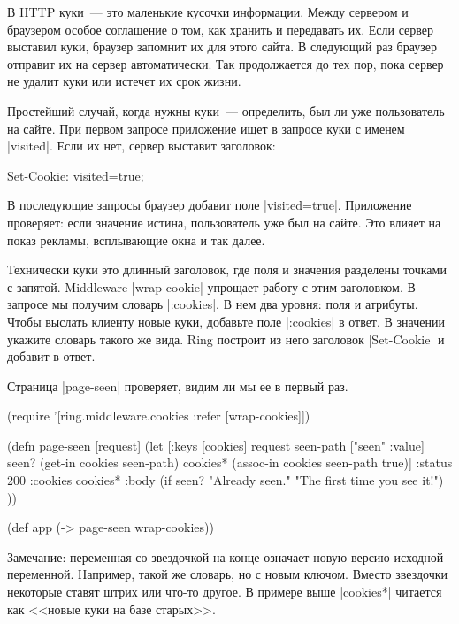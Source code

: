 В HTTP куки~--- это маленькие кусочки информации. Между сервером и браузером
особое соглашение о том, как хранить и передавать их. Если сервер выставил куки,
браузер запомнит их для этого сайта. В следующий раз браузер отправит их на
сервер автоматически. Так продолжается до тех пор, пока сервер не удалит куки
или истечет их срок жизни.

Простейший случай, когда нужны куки~--- определить, был ли уже пользователь на
сайте. При первом запросе приложение ищет в запросе куки с именем
\spverb|visited|. Если их нет, сервер выставит заголовок:

\begin{english}
  \begin{http}
Set-Cookie: visited=true;
  \end{http}
\end{english}

В последующие запросы браузер добавит поле \spverb|visited=true|. Приложение
проверяет: если значение истина, пользователь уже был на сайте.  Это влияет на
показ рекламы, всплывающие окна и так далее.

Технически куки это длинный заголовок, где поля и значения разделены точками с
запятой. Middleware \spverb|wrap-cookie| упрощает работу с этим заголовком. В
запросе мы получим словарь \spverb|:cookies|. В нем два уровня: поля и
атрибуты. Чтобы выслать клиенту новые куки, добавьте поле \spverb|:cookies| в
ответ. В значении укажите словарь такого же вида. Ring построит из него
заголовок \spverb|Set-Cookie| и добавит в ответ.

Страница \spverb|page-seen| проверяет, видим ли мы ее в первый раз.

\begin{english}
  \begin{clojure}
(require '[ring.middleware.cookies
           :refer [wrap-cookies]])

(defn page-seen [request]
  (let [{:keys [cookies]} request
        seen-path ["seen" :value]
        seen? (get-in cookies seen-path)
        cookies* (assoc-in cookies seen-path true)]
    {:status 200
     :cookies cookies*
     :body (if seen?
             "Already seen."
             "The first time you see it!") }))

(def app (-> page-seen
             wrap-cookies))
  \end{clojure}
\end{english}

Замечание: переменная со звездочкой на конце означает новую версию
исходной переменной. Например, такой же словарь, но с новым ключом. Вместо
звездочки некоторые ставят штрих или что-то другое. В примере выше
\spverb|cookies*| читается как <<новые куки на базе старых>>.

